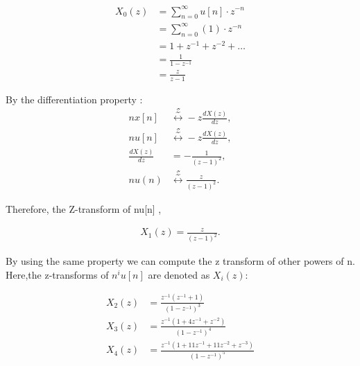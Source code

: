 \documentclass[journal,12pt,twocolumn]{IEEEtran}
\theoremstyle{remark}
\begin{document}
    \begin{align*}
X_0(z) &= \sum_{n=0}^{\infty} u[n]\cdot z^{-n} \\
     &= \sum_{n=0}^{\infty} (1) \cdot z^{-n} \\
     &= 1 + z^{-1} + z^{-2} + \ldots \\
     &= \frac{1}{1 - z^{-1}} \\
     &= \frac{z}{z - 1}
\end{align*}

By the differentiation property :
\begin{align*}
n x[n] &\stackrel{\mathcal{Z}}{\longleftrightarrow} -z \frac{dX(z)}{dz}, \\
n u[n] &\stackrel{\mathcal{Z}}{\longleftrightarrow} -z \frac{dX(z)}{dz}, \\
\frac{dX(z)}{dz} &= -\frac{1}{(z - 1)^2}, \\
n u(n) &\stackrel{\mathcal{Z}}{\longleftrightarrow} \frac{z}{(z - 1)^2}.
\end{align*}

Therefore, the Z-transform of n\cdot u[n] ,

\begin{align}
    X_1(z) = \frac{z}{(z - 1)^2}.
\end{align}

By using the same property we can compute the z
transform of other powers of n. Here,the z-transforms of \(n^i\)\cdot \(u[n]\) are denoted as \(X_i(z)\):

\begin{align}
    X_2(z) &= \frac{z^{-1}(z^{-1}+1)}{(1-z^{-1})^3}\\
    X_3(z) &= \frac{z^{-1}(1+4z^{-1}+z^{-2})}{(1-z^{-1})^4}\\
    X_4(z) &= \frac{z^{-1}(1+11z^{-1}+11z^{-2}+z^{-3})}{(1-z^{-1})^5}
\end{align}
\end{document}
